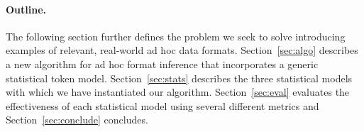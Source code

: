 \paragraph*{Outline.}
The following section further defines the problem we seek to solve
introducing examples of relevant, real-world ad hoc data formats.
Section~\ref{sec:algo} describes a new algorithm for ad hoc format
inference that incorporates a generic statistical token model.
Section~\ref{sec:stats} describes the three statistical models with
which we have
instantiated our algorithm.  Section~\ref{sec:eval} evaluates the
effectiveness of each statistical model using several different
metrics and Section~\ref{sec:conclude} concludes.
